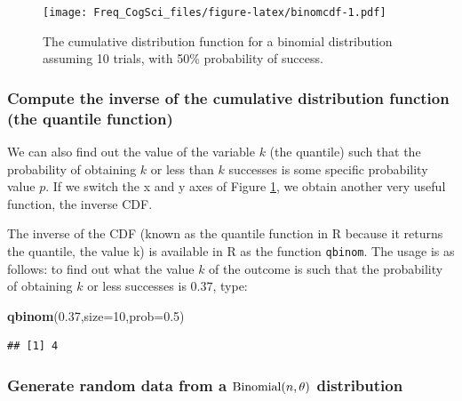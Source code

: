 \documentclass[12pt,]{krantz}
\newenvironment{Shaded}{\begin{snugshade}}{\end{snugshade}}
\newcommand{\DataTypeTok}[1]{\textcolor[rgb]{0.13,0.29,0.53}{#1}}
\newcommand{\DecValTok}[1]{\textcolor[rgb]{0.00,0.00,0.81}{#1}}
\newcommand{\FloatTok}[1]{\textcolor[rgb]{0.00,0.00,0.81}{#1}}
\newcommand{\KeywordTok}[1]{\textcolor[rgb]{0.13,0.29,0.53}{\textbf{#1}}}
\newcommand{\NormalTok}[1]{#1}
\begin{document}
\begin{figure}
\centering
\texttt{[image: Freq\_CogSci\_files/figure-latex/binomcdf-1.pdf]}
\caption{\label{fig:binomcdf}The cumulative distribution function for a binomial distribution assuming 10 trials, with 50\% probability of success.}
\end{figure}

\hypertarget{compute-the-inverse-of-the-cumulative-distribution-function-the-quantile-function}{%
\subsubsection{Compute the inverse of the cumulative distribution function (the quantile function)}\label{compute-the-inverse-of-the-cumulative-distribution-function-the-quantile-function}}

We can also find out the value of the variable \(k\) (the quantile) such that the probability of obtaining \(k\) or less than \(k\) successes is some specific probability value \(p\). If we switch the x and y axes of Figure \ref{fig:binomcdf}, we obtain another very useful function, the inverse CDF.

The inverse of the CDF (known as the quantile function in R because it returns the quantile, the value k) is available in R as the function \texttt{qbinom}. The usage is as follows: to find out what the value \(k\) of the outcome is such that the probability of obtaining \(k\) or less successes is \(0.37\), type:

\begin{Shaded}
\begin{Highlighting}[]
\KeywordTok{qbinom}\NormalTok{(}\FloatTok{0.37}\NormalTok{,}\DataTypeTok{size=}\DecValTok{10}\NormalTok{,}\DataTypeTok{prob=}\FloatTok{0.5}\NormalTok{)}
\end{Highlighting}
\end{Shaded}

\begin{verbatim}
## [1] 4
\end{verbatim}

\hypertarget{generate-random-data-from-a-hboxbinomialntheta-distribution}{%
\subsubsection{\texorpdfstring{Generate random data from a \(\hbox{Binomial}(n,\theta)\) distribution}{Generate random data from a \textbackslash{}hbox\{Binomial\}(n,\textbackslash{}theta) distribution}}\label{generate-random-data-from-a-hboxbinomialntheta-distribution}}
\end{document}

